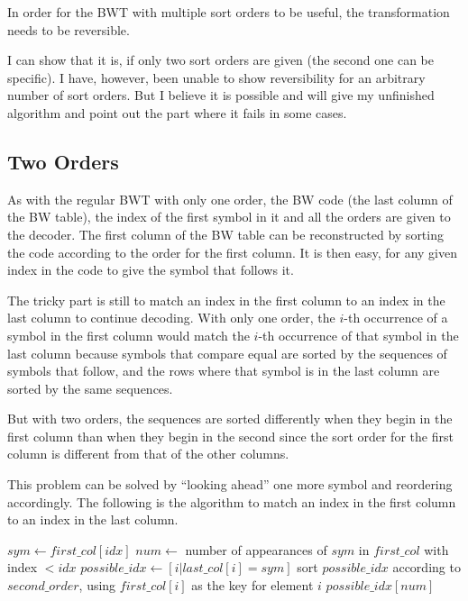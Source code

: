 \documentclass[a4paper]{scrreprt}
\begin{document}
In order for the BWT with multiple sort orders to be useful, the transformation
needs to be reversible.

I can show that it is, if only two sort orders are given (the second one can be
specific). I have, however, been unable to show reversibility for an arbitrary
number of sort orders. But I believe it is possible and will give my unfinished
algorithm and point out the part where it fails in some cases.

\subsection{Two Orders}

As with the regular BWT with only one order, the BW code (the last column of
the BW table), the index of the first symbol in it and all the orders are given
to the decoder. The first column of the BW table can be reconstructed by sorting
the code according to the order for the first column. It is then easy, for any
given index in the code to give the symbol that follows it.

The tricky part is still to match an index in the first column to an index in
the last column to continue decoding. With only one order, the \(i\)-th
occurrence of a symbol in the first column would match the \(i\)-th occurrence
of that symbol in the last column because symbols that compare equal are sorted
by the sequences of symbols that follow, and the rows where that symbol is in
the last column are sorted by the same sequences.

But with two orders, the sequences are sorted differently when they begin in the
first column than when they begin in the second since the sort order for the
first column is different from that of the other columns.

This problem can be solved by ``looking ahead'' one more symbol and reordering
accordingly. The following is the algorithm to match an index in the first
column to an index in the last column.

\begin{algorithmic}[1]
\State $sym \gets first\_col[idx]$
\State $num \gets$ number of appearances of $sym$ in $first\_col$ with index $<
idx$
\State $possible\_idx \gets [i | last\_col[i] = sym]$
\State sort $possible\_idx$ according to $second\_order$, using $first\_col[i]$
as the key for element $i$
\State \Return $possible\_idx[num]$
\EndProcedure
\end{algorithmic}
\end{document}
